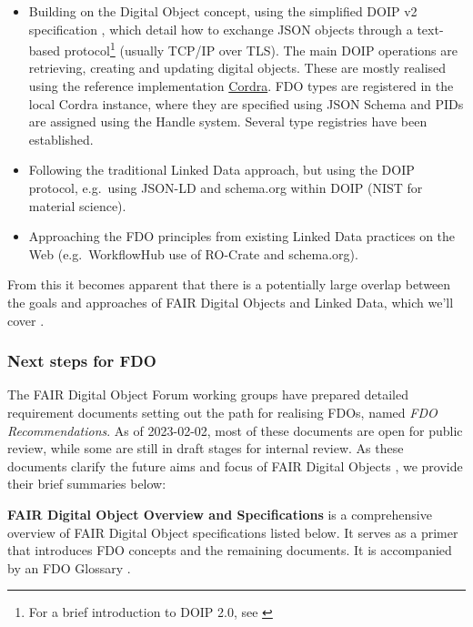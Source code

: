 \documentclass[fleqn,10pt,NOlineno]{wlpeerjlua}
\providecommand{\tightlist}{%
  \setlength{\itemsep}{0pt}\setlength{\parskip}{0pt}}
\begin{document}
\begin{itemize}
\tightlist
\item
  Building on the Digital Object concept, using the simplified DOIP v2 specification \autocite{foundationDigitalObjectInterface}, which detail how to exchange JSON objects through a text-based protocol\footnote{For a brief introduction to DOIP 2.0, see \autocite{DOIPExamplesCordraa}} (usually TCP/IP over TLS). The main DOIP operations are retrieving, creating and updating digital objects. These are mostly realised using the reference implementation \href{https://cordra.org/}{Cordra}. FDO types are registered in the local Cordra instance, where they are specified using JSON Schema \autocite{Draftbhuttonjsonschema} and PIDs are assigned using the Handle system. Several type registries have been established.
\item
  Following the traditional Linked Data approach, but using the DOIP protocol, e.g.~using JSON-LD and schema.org within DOIP (NIST for material science).
\item
  Approaching the FDO principles from existing Linked Data practices on the Web (e.g.~WorkflowHub use of RO-Crate and schema.org).
\end{itemize}

From this it becomes apparent that there is a potentially large overlap between the goals and approaches of FAIR Digital Objects and Linked Data, which we'll cover .


\subsubsection*{Next steps for FDO}\label{sec:next-step-fdo}

The FAIR Digital Object Forum \autocite{FAIRDigitalObjects} working groups have prepared detailed requirement documents \autocite{fdo-Specs} setting out the path for realising FDOs, named \emph{FDO Recommendations}. As of 2023-02-02, most of these documents are open for public review, while some are still in draft stages for internal review. As these documents clarify the future aims and focus of FAIR Digital Objects \autocite{fdo-Roadmap}, we provide their brief summaries below:

\textbf{FAIR Digital Object Overview and Specifications} \autocite{fdo-Overview} is a comprehensive overview of FAIR Digital Object specifications listed below. It serves as a primer that introduces FDO concepts and the remaining documents. It is accompanied by an FDO Glossary \autocite{fdo-Glossary}.
\end{document}
